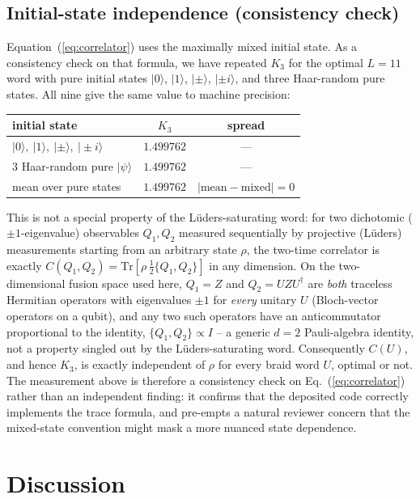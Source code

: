 \documentclass[aps,prx,reprint,amsmath,amssymb,floatfix,nofootinbib,superscriptaddress]{revtex4-2}
\begin{document}
\subsection{Initial-state independence (consistency check)}

Equation~(\ref{eq:correlator}) uses the maximally mixed initial state.
As a consistency check on that formula, we have repeated $K_{3}$ for
the optimal $L=11$ word with pure initial states $|0\rangle$,
$|1\rangle$, $|\pm\rangle$, $|\pm i\rangle$, and three Haar-random pure
states. All nine give the same value to machine precision:
\begin{center}\small
\begin{tabular}{lcc}
\toprule
initial state & $K_{3}$ & spread \\
\midrule
$|0\rangle,\ |1\rangle,\ |\pm\rangle,\ |\pm i\rangle$
              & $1.499762$ & --- \\
$3$ Haar-random pure $|\psi\rangle$
              & $1.499762$ & --- \\
\midrule
mean over pure states & $1.499762$ &
        $|\text{mean}-\text{mixed}| = 0$ \\
\bottomrule
\end{tabular}
\end{center}
This is not a special property of the L\"uders-saturating word: for
two dichotomic ($\pm1$-eigenvalue) observables $Q_{1},Q_{2}$ measured
sequentially by projective (L\"uders) measurements starting from an
arbitrary state $\rho$, the two-time correlator is exactly
$C(Q_{1},Q_{2})=\mathrm{Tr}[\rho\,\tfrac{1}{2}\{Q_{1},Q_{2}\}]$ in any
dimension. On the two-dimensional fusion space used here, $Q_{1}=Z$
and $Q_{2}=UZU^{\dagger}$ are \emph{both} traceless Hermitian
operators with eigenvalues $\pm1$ for \emph{every} unitary $U$
(Bloch-vector operators on a qubit), and any two such operators
have an anticommutator proportional to the identity,
$\{Q_{1},Q_{2}\}\propto I$ -- a generic $d=2$ Pauli-algebra identity,
not a property singled out by the L\"uders-saturating word.
Consequently $C(U)$, and hence $K_{3}$, is exactly independent of
$\rho$ for every braid word $U$, optimal or not. The measurement
above is therefore a consistency check on
Eq.~(\ref{eq:correlator}) rather than an independent finding: it
confirms that the deposited code correctly implements the trace
formula, and pre-empts a natural reviewer concern that the
mixed-state convention might mask a more nuanced state dependence.

\section{Discussion}
\label{sec:discussion}
\end{document}
